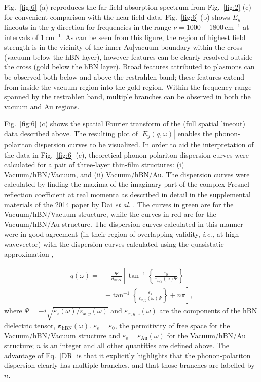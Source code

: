 \documentclass[preprint,
amsmath,amssymb,
aip,
jap,
floatfix,]{revtex4-2}
\begin{document}
				Fig.~\ref{fig:6} (a) reproduces the far-field absorption spectrum from Fig.~\ref{fig:2} (c)  for convenient comparison with the near field data. Fig.~\ref{fig:6} (b) shows $E_y$ lineouts in the $y$-direction for frequencies in the range $\nu = 1000 - 1800\, \mathrm{cm}^{-1}$ at intervals of $1\, \mathrm{cm}^{-1}$. As can be seen from this figure, the region of highest field strength is in the vicinity of the inner Au|vacuum boundary within the cross (vacuum below the hBN layer), however features can be clearly resolved outside the cross (gold below the hBN layer). Broad features attributed to plasmons can be observed both below and above the restrahlen band; these features extend from inside the vacuum region into the gold region. Within the frequency range spanned by the restrahlen band, multiple branches can be observed in both the vacuum and Au regions. 

				Fig.~\ref{fig:6} (c) shows the spatial Fourier transform of the (full spatial lineout) data described above. The resulting plot of $|E_y(q,\omega)|$ enables the phonon-polariton dispersion curves to be visualized. In order to aid the interpretation of the data in Fig.~\ref{fig:6} (c), theoretical phonon-polariton dispersion curves were calculated for a pair of three-layer thin-film structures: (i) Vacuum/hBN/Vacuum, and (ii) Vacuum/hBN/Au. The dispersion curves were calculated by finding the maxima of the imaginary part of the complex Fresnel reflection coefficient at real momenta as described in detail in the supplemental materials of the 2014 paper by Dai \textit{et al.} \cite{Dai:14}. The curves in green are for the  Vacuum/hBN/Vacuum structure, while the curves in red are for the Vacuum/hBN/Au structure. The dispersion curves calculated in this manner were in good agreement (in their region of overlapping validity, \textit{i.e.,} at high wavevector) with the dispersion curves calculated using the quasistatic approximation \cite{Dai:14, Kumar:15}, 
			
				\begin{align}
				  q(\omega)   = & -  \frac{\Psi}{d_\mathrm{hBN}} \left[  
				    \tan^{-1} \left\{ \frac{\varepsilon_0}{\varepsilon_{x,y}(\omega)\Psi} \right\} \right. \nonumber\\
				     & +  \left. \tan^{-1} \left\{ \frac{\varepsilon_\mathrm{s}}{\varepsilon_{x,y}(\omega)\Psi} \right\} + n\pi \right],
				  \label{DR}
				\end{align}
				\noindent where $\Psi = -i\sqrt{\varepsilon_z(\omega)/\varepsilon_{x,y}(\omega)}$ and $\varepsilon_{x,y,z}(\omega)$ are the components of the hBN dielectric tensor, $\bm{\varepsilon}_\mathrm{hBN}(\omega)$. $\varepsilon_\mathrm{s} = \varepsilon_0$, the permitivity of free space for the Vacuum/hBN/Vacuum structure and $\varepsilon_\mathrm{s} = \varepsilon_\mathrm{Au}(\omega)$ for the Vacuum/hBN/Au structure; $n$ is an integer and all other quantities are defined above. The advantage of Eq.~\ref{DR} is that it explicitly highlights that the phonon-polariton dispersion clearly has multiple branches, and that those branches are labelled by $n$.
\end{document}
